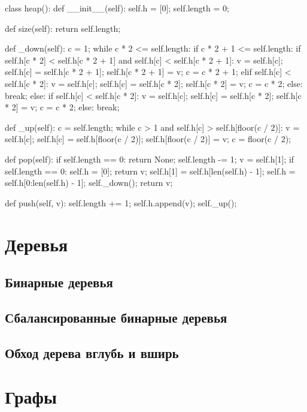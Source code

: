\begin{python}
class heap():
	def __init__(self):
		self.h = [0];
		self.length = 0;

	def size(self):
		return self.length;

	def _down(self):
		c = 1;
		while c * 2 <= self.length:
			if c * 2 + 1 <= self.length:
				if self.h[c * 2] < self.h[c * 2 + 1] 
					and self.h[c] < self.h[c * 2 + 1]:
					v = self.h[c];
					self.h[c] = self.h[c * 2 + 1];
					self.h[c * 2 + 1] = v;
					c = c * 2 + 1;
				elif self.h[c] < self.h[c * 2]:
					v = self.h[c];
					self.h[c] = self.h[c * 2];
					self.h[c * 2] = v;
					c = c * 2;
				else:
					break;
			else:
				if self.h[c] < self.h[c * 2]:
					v = self.h[c];
					self.h[c] = self.h[c * 2];
					self.h[c * 2] = v;
					c = c * 2;
				else:
					break;

	def _up(self):
		c = self.length;
		while c > 1 and self.h[c] > self.h[floor(c / 2)]:
			v = self.h[c];
			self.h[c] = self.h[floor(c / 2)];
			self.h[floor(c / 2)] = v;
			c = floor(c / 2);

	def pop(self):
		if self.length == 0:
			return None;
		self.length -= 1;
		v = self.h[1];
		if self.length == 0:
			self.h = [0];
			return v;
		self.h[1] = self.h[len(self.h) - 1];
		self.h = self.h[0:len(self.h) - 1];
		self._down();
		return v;

	def push(self, v):
		self.length += 1;
		self.h.append(v);
		self._up();
\end{python}

\section{Деревья}

\subsection{Бинарные деревья}

\subsection{Сбалансированные бинарные деревья}

\subsection{Обход дерева вглубь и вширь}

\section{Графы}

